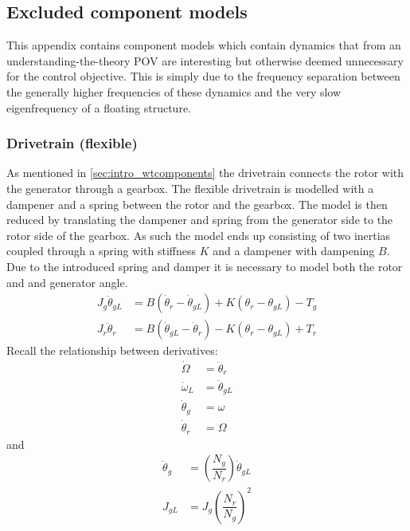 \subsection{Excluded component models} \label{sec:app_excl_comp_models}
This appendix contains component models which contain dynamics that from an understanding-the-theory POV are interesting but otherwise deemed unnecessary for the control objective. This is simply due to the frequency separation between the generally higher frequencies of these dynamics and the very slow eigenfrequency of a floating structure.

\subsubsection{Drivetrain (flexible)} \label{sec:mod_drt_flex}
As mentioned in \cref{sec:intro_wtcomponents} the drivetrain connects the rotor with the generator through a gearbox. The flexible drivetrain is modelled with a dampener and a spring between the rotor and the gearbox. The model is then reduced by translating the dampener and spring from the generator side to the rotor side of the gearbox. As such the model ends up consisting of two inertias coupled through a spring with stiffness $ K $ and a dampener with dampening $ B $. Due to the introduced spring and damper it is necessary to model both the rotor and and generator angle.
\begin{align} 
	J_{g} \ddot{\theta}_{gL} & = B (\dot{\theta}_r - \dot{\theta}_{gL}) + K(\theta_r - \theta_{gL}) - T_{g} \label{eq:comp_comp_drivetrain_flex_1} \\
	J_{r} \ddot{\theta}_r & = B (\dot{\theta}_{gL} - \dot{\theta}_r ) - K(\theta_r - \theta_{gL}) + T_{r} \label{eq:comp_comp_drivetrain_flex_2}
\end{align}
Recall the relationship between derivatives:
\begin{align}
	\dot{\Omega} & = \ddot{\theta}_r \\
	\dot{\omega}_{L} & = \ddot{\theta}_{gL} \\
	\dot{\theta}_g & = \omega \\
	\dot{\theta}_r & = \Omega
\end{align}
and
\begin{align}
	\dot{\theta}_g 	&= \left(\dfrac{N_g}{N_r}\right) \dot{\theta}_{gL} \label{eq:comp_comp_drivetrain_flex_mod_3} \\
	J_{gL} 			&= J_{g} \left(\dfrac{N_r}{N_g}\right)^2 \label{eq:comp_comp_inertiamap_flex}
\end{align}
